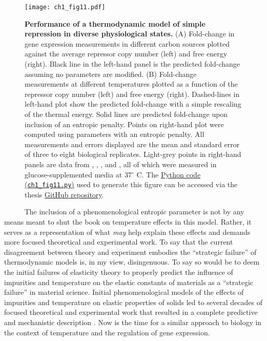 \documentclass[12pt]{caltech_thesis}
\begin{document}
\hypertarget{fig:growth_results_intro}{%
\begin{figure}
\centering
\texttt{[image: ch1\_fig11.pdf]}
\caption[{Performance of a simple thermodynamic model of simple
repression in diverse physiological states.}]{\textbf{Performance of a
thermodynamic model of simple repression in diverse physiological
states.} (A) Fold-change in gene expression measurements in different
carbon sources plotted against the average repressor copy number (left)
and free energy (right). Black line in the left-hand panel is the
predicted fold-change assuming no parameters are modified. (B)
Fold-change measurements at different temperatures plotted as a function
of the repressor copy number (left) and free energy (right).
Dashed-lines in left-hand plot show the predicted fold-change with a
simple rescaling of the thermal energy. Solid lines are predicted
fold-change upon inclusion of an entropic penalty. Points on right-hand
plot were computed using parameters with an entropic penalty. All
measurements and errors displayed are the mean and standard error of
three to eight biological replicates. Light-grey points in right-hand
panels are data from \textcite{garcia2011}, \textcite{brewster2014},
\textcite{razo-mejia2018}, and \textcite{chure2019}, all of which were
measured in glucose-supplemented media at 37\(^\circ\) C. The
\href{https://github.com/gchure/phd/blob/master/src/chapter_01/code/ch1_fig11.py}{Python
code (\texttt{ch1\_fig11.py})} used to generate this figure can be
accessed via the thesis \href{https://github.com/gchure/phd}{GitHub
repository}.}
\label{fig:growth_results_intro}
\end{figure}
}

~~~~~ The inclusion of a phenomenological entropic parameter is not by
any means meant to shut the book on temperature effects in this model.
Rather, it serves as a representation of what \emph{may} help explain
these effects and demands more focused theoretical and experimental
work. To say that the current disagreement between theory and experiment
embodies the ``strategic failure'' of thermodynamic models is, in my
view, disingenuous. To say so would be to deem the initial failures of
elasticity theory to properly predict the influence of impurities and
temperature on the elastic constants of materials as a ``strategic
failure'' in material science. Initial phenomenological models of the
effects of impurities and temperature on elastic properties of solids
\autocite{friedel1974} led to several decades of focused theoretical and
experimental work that resulted in a complete predictive and mechanistic
description \autocite{phillips2001}. Now is the time for a similar
approach to biology in the context of temperature and the regulation of
gene expression.
\end{document}
